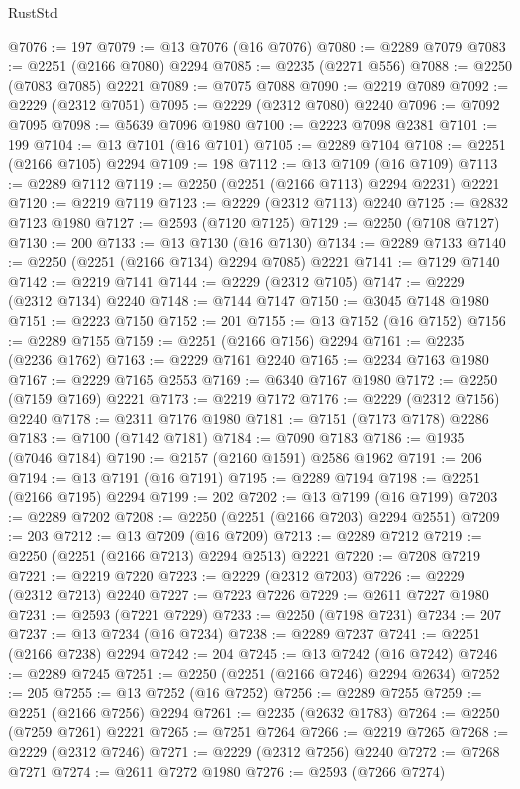 \begin{lexlean}{RustStd}
\begin{coremodule}
@7076 := 197
@7079 := @13 @7076 (@16 @7076)
@7080 := @2289 @7079
@7083 := @2251 (@2166 @7080) @2294
@7085 := @2235 (@2271 @556)
@7088 := @2250 (@7083 @7085) @2221
@7089 := @7075 @7088
@7090 := @2219 @7089
@7092 := @2229 (@2312 @7051)
@7095 := @2229 (@2312 @7080) @2240
@7096 := @7092 @7095
@7098 := @5639 @7096 @1980
@7100 := @2223 @7098 @2381
@7101 := 199
@7104 := @13 @7101 (@16 @7101)
@7105 := @2289 @7104
@7108 := @2251 (@2166 @7105) @2294
@7109 := 198
@7112 := @13 @7109 (@16 @7109)
@7113 := @2289 @7112
@7119 := @2250 (@2251 (@2166 @7113) @2294 @2231) @2221
@7120 := @2219 @7119
@7123 := @2229 (@2312 @7113) @2240
@7125 := @2832 @7123 @1980
@7127 := @2593 (@7120 @7125)
@7129 := @2250 (@7108 @7127)
@7130 := 200
@7133 := @13 @7130 (@16 @7130)
@7134 := @2289 @7133
@7140 := @2250 (@2251 (@2166 @7134) @2294 @7085) @2221
@7141 := @7129 @7140
@7142 := @2219 @7141
@7144 := @2229 (@2312 @7105)
@7147 := @2229 (@2312 @7134) @2240
@7148 := @7144 @7147
@7150 := @3045 @7148 @1980
@7151 := @2223 @7150
@7152 := 201
@7155 := @13 @7152 (@16 @7152)
@7156 := @2289 @7155
@7159 := @2251 (@2166 @7156) @2294
@7161 := @2235 (@2236 @1762)
@7163 := @2229 @7161 @2240
@7165 := @2234 @7163 @1980
@7167 := @2229 @7165 @2553
@7169 := @6340 @7167 @1980
@7172 := @2250 (@7159 @7169) @2221
@7173 := @2219 @7172
@7176 := @2229 (@2312 @7156) @2240
@7178 := @2311 @7176 @1980
@7181 := @7151 (@7173 @7178) @2286
@7183 := @7100 (@7142 @7181)
@7184 := @7090 @7183
@7186 := @1935 (@7046 @7184)
@7190 := @2157 (@2160 @1591) @2586 @1962
@7191 := 206
@7194 := @13 @7191 (@16 @7191)
@7195 := @2289 @7194
@7198 := @2251 (@2166 @7195) @2294
@7199 := 202
@7202 := @13 @7199 (@16 @7199)
@7203 := @2289 @7202
@7208 := @2250 (@2251 (@2166 @7203) @2294 @2551)
@7209 := 203
@7212 := @13 @7209 (@16 @7209)
@7213 := @2289 @7212
@7219 := @2250 (@2251 (@2166 @7213) @2294 @2513) @2221
@7220 := @7208 @7219
@7221 := @2219 @7220
@7223 := @2229 (@2312 @7203)
@7226 := @2229 (@2312 @7213) @2240
@7227 := @7223 @7226
@7229 := @2611 @7227 @1980
@7231 := @2593 (@7221 @7229)
@7233 := @2250 (@7198 @7231)
@7234 := 207
@7237 := @13 @7234 (@16 @7234)
@7238 := @2289 @7237
@7241 := @2251 (@2166 @7238) @2294
@7242 := 204
@7245 := @13 @7242 (@16 @7242)
@7246 := @2289 @7245
@7251 := @2250 (@2251 (@2166 @7246) @2294 @2634)
@7252 := 205
@7255 := @13 @7252 (@16 @7252)
@7256 := @2289 @7255
@7259 := @2251 (@2166 @7256) @2294
@7261 := @2235 (@2632 @1783)
@7264 := @2250 (@7259 @7261) @2221
@7265 := @7251 @7264
@7266 := @2219 @7265
@7268 := @2229 (@2312 @7246)
@7271 := @2229 (@2312 @7256) @2240
@7272 := @7268 @7271
@7274 := @2611 @7272 @1980
@7276 := @2593 (@7266 @7274)

\end{coremodule}
\end{lexlean}
